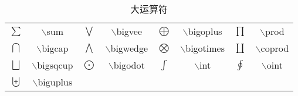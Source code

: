 \documentclass[UTF8]{ctexart}
\begin{document}
\begin{table}[H]
	\begin{center}
		\caption{大运算符}
		\begin{tabular}{cccccccc}
			
			
			$\sum$  &  $\backslash$sum  &  $\bigvee$  & $\backslash$bigvee  &  $\bigoplus$  & $\backslash$bigoplus  &  $\prod$  &  $\backslash$prod \\
			
			$\bigcap$ & $\backslash$bigcap &  $\bigwedge$  & $\backslash$bigwedge   &  $\bigotimes$  & $\backslash$bigotimes &  $\coprod$ & $\backslash$coprod \\
			
			
			$\bigsqcup$  &  $\backslash$bigsqcup  &  $\bigodot$  & $\backslash$bigodot  &  $\int$  & $\backslash$int  &  $\oint$  &  $\backslash$oint \\
			
			$\biguplus$  &  $\backslash$biguplus  \\
		\end{tabular}
	\end{center}
\end{table}
\end{document}
